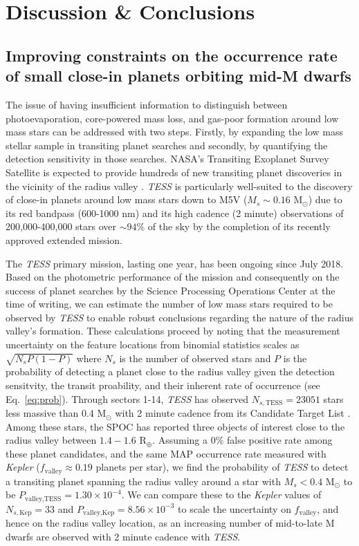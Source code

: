 \documentclass[twocolumn]{emulateapj}
\newcommand{\kepler}[1]{\emph{Kepler}#1}
\newcommand{\tess}[1]{\emph{TESS}#1}
\begin{document}
\section{Discussion \& Conclusions} \label{sect:conclusion}
\subsection{Improving constraints on the occurrence rate of small close-in planets orbiting mid-M dwarfs}
The issue of having insufficient information to distinguish between photoevaporation, core-powered mass loss, and gas-poor
formation around low mass stars can be addressed with two steps. Firstly, by expanding the low mass stellar sample in 
transiting planet searches and secondly, by quantifying the detection sensitivity in those searches. 
NASA's Transiting Exoplanet Survey Satellite \citep[\tess{;}][]{ricker15} is expected to provide hundreds of new transiting
planet discoveries in the vicinity of the radius valley \citep{barclay18}. \tess{} is particularly well-suited to the discovery of
close-in planets around low mass stars down to M5V ($M_s\sim 0.16$ M$_{\odot}$) due to its red bandpass (600-1000 nm)
and its high cadence (2 minute) observations of 200,000-400,000 stars over $\sim 94$\% of the sky by the completion of its
recently approved extended mission.

The \tess{} primary mission, lasting one year, has been ongoing since July 2018. 
Based on the photometric performance of the mission and consequently on the success of planet searches by the
Science Processing Operations Center \citep[SPOC;][]{jenkins16,twicken18,li18} at the time of writing,
we can estimate the number of low mass stars required to be observed
by \tess{} to enable robust conclusions regarding the nature of the radius valley's formation. These calculations
proceed by noting that the measurement uncertainty on the feature locations from binomial statistics scales as
$\sqrt{N_sP(1-P)}$ where $N_s$ is the number of observed stars and $P$ is the probability of detecting a planet close to
the radius valley 
given the detection sensitvity, the transit proability, and their inherent rate of occurrence (see Eq.~\ref{eq:prob}).
Through sectors 1-14, \tess{} has observed $N_{s,\text{TESS}} = 23051$ stars less massive than 0.4 M$_{\odot}$
with 2 minute cadence from its Candidate Target List \citep[CTL;][]{stassun19}.
Among these stars, the SPOC has reported three objects of interest close to the radius valley
between $1.4-1.6$ R$_{\oplus}$. Assuming a 0\% false positive rate
among these planet candidates, and the same MAP occurrence rate measured with \kepler{}
($f_{\text{valley}}\approx 0.19$ planets per star), we find the probability of \tess{} to detect a transiting planet
spanning the radius valley around a star with $M_s<0.4$ M$_{\odot}$ to be 
$P_{\text{valley,TESS}}=1.30 \times 10^{-4}$. We can compare these to the \kepler{} values of $N_{s,\text{Kep}}=33$ and
$P_{\text{valley,Kep}}=8.56\times 10^{-3}$ to scale the uncertainty on $f_{\text{valley}}$, and hence on the radius
valley location, as an increasing number of mid-to-late M dwarfs are observed with 2 minute cadence with \tess{.}
\end{document}
